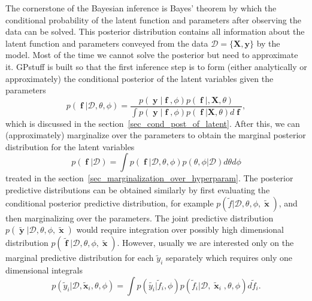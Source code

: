 \documentclass[twoside,11pt]{article}
\DeclareMathOperator{\x}{\mathbf{x}}
\DeclareMathOperator{\f}{\mathbf{f}}
\DeclareMathOperator{\y}{\mathbf{y}}
\newcommand{\mb}{\mathbf}
\newcommand{\pkg}[1]{{\fontseries{b}\selectfont #1}}
\begin{document}
The cornerstone of the Bayesian inference is Bayes' theorem by
which the conditional probability of the latent function and
parameters after observing the data can be solved. This posterior
distribution contains all information about the latent function and
parameters conveyed from the data $\mathcal{D} = \{\mb{X}, \mb{y}\}$
by the model. Most of the time we cannot solve the posterior but need
to approximate it.  \pkg{GPstuff} is built so that the first inference
step is to form (either analytically or approximately) the conditional
posterior of the latent variables given the parameters 
%
\begin{equation}\label{eq_conditional_posterior_of_f}
p(\f|\mathcal{D}, \theta, \phi) =
\frac{p(\y|\f,\phi)p(\f|,\mb{X}, \theta)}{\int p(\y|\f,\phi)p(\f|\mb{X},\theta) d\f},
\end{equation}
%
which is discussed in the section~\ref{sec_cond_post_of_latent}. After
this, we can (approximately) marginalize over the parameters to obtain the
marginal posterior distribution for the latent variables
%
\begin{equation}
p(\f|\mathcal{D}) = \int p(\f|\mathcal{D}, \theta, \phi) p(\theta, \phi|\mathcal{D}) d\theta d\phi
\end{equation}
%
treated in the section~\ref{sec_marginalization_over_hyperparam}. The
posterior predictive distributions can be obtained similarly by first
evaluating the conditional posterior predictive distribution, for
example $p(\tilde{f}|\mathcal{D}, \theta, \phi, \tilde{\x})$, and then
marginalizing over the parameters. The joint predictive distribution
$p(\tilde{\y}|\mathcal{D}, \theta, \phi, \tilde{\x})$ would require
integration over possibly high dimensional distribution
$p(\tilde{\f}|\mathcal{D}, \theta, \phi, \tilde{\x})$. However,
usually we are interested only on the marginal predictive distribution
for each $\tilde{y}_i$ separately which requires only one dimensional
integrals
%
\begin{equation}
  p(\tilde{y}_i | \mathcal{D}, \tilde{\mb{x}}_i, \theta, \phi) = \int p(\tilde{y_i}|
  \tilde{f}_i, \phi) p(\tilde{f}_i | 
  \mathcal{D}, \tilde{\x}_i, \theta, \phi)d \tilde{f}_i.
\end{equation}
\end{document}
